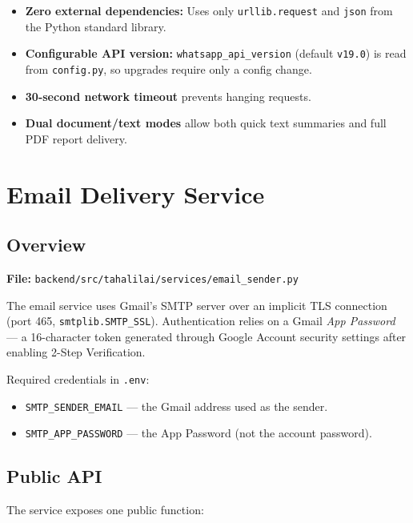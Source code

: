 \documentclass[12pt, a4paper]{article}
\begin{document}
\begin{itemize}[leftmargin=1.5em]
  \item \textbf{Zero external dependencies:} Uses only \texttt{urllib.request}
        and \texttt{json} from the Python standard library.
  \item \textbf{Configurable API version:} \texttt{whatsapp\_api\_version}
        (default \texttt{v19.0}) is read from \texttt{config.py}, so upgrades
        require only a config change.
  \item \textbf{30-second network timeout} prevents hanging requests.
  \item \textbf{Dual document/text modes} allow both quick text summaries and
        full PDF report delivery.
\end{itemize}

\section{Email Delivery Service}

\subsection{Overview}

\textbf{File:} \texttt{backend/src/tahalilai/services/email\_sender.py}

The email service uses Gmail's SMTP server over an implicit TLS connection
(port 465, \texttt{smtplib.SMTP\_SSL}). Authentication relies on a Gmail
\emph{App Password} — a 16-character token generated through Google Account
security settings after enabling 2-Step Verification.

Required credentials in \texttt{.env}:
\begin{itemize}[leftmargin=1.5em]
  \item \texttt{SMTP\_SENDER\_EMAIL} — the Gmail address used as the sender.
  \item \texttt{SMTP\_APP\_PASSWORD} — the App Password (not the account password).
\end{itemize}

\subsection{Public API}

The service exposes one public function:
\end{document}
